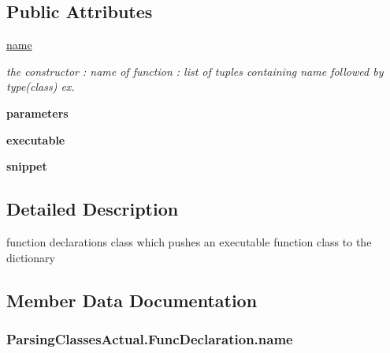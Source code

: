 \subsection*{Public Attributes}
\begin{DoxyCompactItemize}
\item 
\hyperlink{class_parsing_classes_actual_1_1_func_declaration_ac13c88a74a9e9cbf894f96a8b9295cbd}{name}
\begin{DoxyCompactList}\small\item\em the constructor  \+: name of function  \+: list of tuples containing name followed by type(class) ex. \end{DoxyCompactList}\item 
{\bfseries parameters}\hypertarget{class_parsing_classes_actual_1_1_func_declaration_ad856297c8aa971160a0e892db7b787fc}{}\label{class_parsing_classes_actual_1_1_func_declaration_ad856297c8aa971160a0e892db7b787fc}

\item 
{\bfseries executable}\hypertarget{class_parsing_classes_actual_1_1_func_declaration_a2596cd4bcb7077b2191c4c84620b4340}{}\label{class_parsing_classes_actual_1_1_func_declaration_a2596cd4bcb7077b2191c4c84620b4340}

\item 
{\bfseries snippet}\hypertarget{class_parsing_classes_actual_1_1_func_declaration_a5db10dfbfe72933c0218a16fdb83e7d0}{}\label{class_parsing_classes_actual_1_1_func_declaration_a5db10dfbfe72933c0218a16fdb83e7d0}

\end{DoxyCompactItemize}


\subsection{Detailed Description}
function declarations class which pushes an executable function class to the dictionary 

\subsection{Member Data Documentation}
\subsubsection[{\texorpdfstring{name}{name}}]{\setlength{\rightskip}{0pt plus 5cm}Parsing\+Classes\+Actual.\+Func\+Declaration.\+name}\hypertarget{class_parsing_classes_actual_1_1_func_declaration_ac13c88a74a9e9cbf894f96a8b9295cbd}{}\label{class_parsing_classes_actual_1_1_func_declaration_ac13c88a74a9e9cbf894f96a8b9295cbd}


